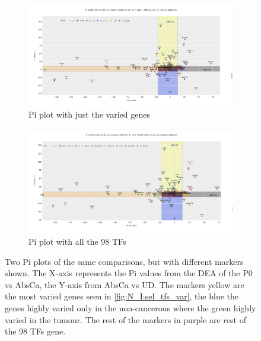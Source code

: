 \begin{figure}[!h]
    \captionsetup[subfigure]{justification=Centering}
\begin{subfigure}[!t]{1.0\textwidth}
    \includegraphics[width=1.0\textwidth,height=1.0\textheight,keepaspectratio]{Sections/Network_I/Resources/selective_pruning/sel_tfs_pi_all_var_rect.png}
    
    \caption{Pi plot with just the varied genes}
    
    \label{fig:N_I:pi_sel_tfs_var}
\end{subfigure}\hspace{\fill} %

\begin{subfigure}[!t]{1.0\textwidth}
    \includegraphics[width=1.0\textwidth,height=1.0\textheight,keepaspectratio]{Sections/Network_I/Resources/selective_pruning/sel_tfs_pi_all_tissueDiff.png}
    
    \caption{Pi plot with all the 98 TFs}
    
    \label{fig:N_I:pi_sel_tfs_all}
\end{subfigure}\hspace{\fill} %

    \caption{Two Pi plots of the same comparisons, but with different markers shown. The X-axis represents the Pi values from the DEA of the P0 vs AbsCa, the Y-axis from AbsCa vs UD. The markers yellow are the most varied genes seen in \cref{fig:N_I:sel_tfs_var}, the blue the genes highly varied only in the non-cancerous where the green highly varied in the tumour. The rest of the markers in purple are rest of the 98 TFs gene.}
    
    \label{fig:N_I:pi_sel_tfs}
\end{figure}

